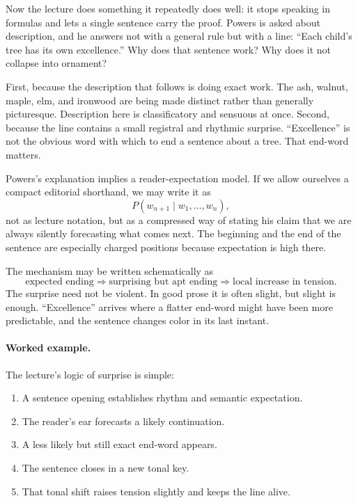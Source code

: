 Now the lecture does something it repeatedly does well: it stops speaking in formulas and lets a single sentence carry the proof. Powers is asked about description, and he answers not with a general rule but with a line: ``Each child's tree has its own excellence.'' Why does that sentence work? Why does it not collapse into ornament?

First, because the description that follows is doing exact work. The ash, walnut, maple, elm, and ironwood are being made distinct rather than generally picturesque. Description here is classificatory and sensuous at once. Second, because the line contains a small registral and rhythmic surprise. ``Excellence'' is not the obvious word with which to end a sentence about a tree. That end-word matters.

Powers's explanation implies a reader-expectation model. If we allow ourselves a compact editorial shorthand, we may write it as
\begin{equation}
P(w_{n+1}\mid w_1,\dots,w_n),
\end{equation}
not as lecture notation, but as a compressed way of stating his claim that we are always silently forecasting what comes next. The beginning and the end of the sentence are especially charged positions because expectation is high there.

The mechanism may be written schematically as
\begin{equation}
\text{expected ending} \Rightarrow \text{surprising but apt ending} \Rightarrow \text{local increase in tension}.
\end{equation}
The surprise need not be violent. In good prose it is often slight, but slight is enough. ``Excellence'' arrives where a flatter end-word might have been more predictable, and the sentence changes color in its last instant.

\paragraph{Worked example.} The lecture's logic of surprise is simple:
\begin{enumerate}
\item A sentence opening establishes rhythm and semantic expectation.
\item The reader's ear forecasts a likely continuation.
\item A less likely but still exact end-word appears.
\item The sentence closes in a new tonal key.
\item That tonal shift raises tension slightly and keeps the line alive.
\end{enumerate}


